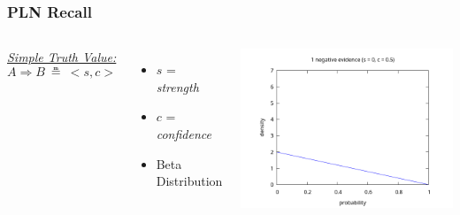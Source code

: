 \documentclass[aspectratio=169]{beamer}
\newcommand{\limp}{\Rightarrow}
\newcommand{\STV}[2]{<\!#1, #2\!>}
\begin{document}
\begin{frame}
  \frametitle{PLN Recall}
  \begin{columns}
    \column{5cm}
    \underline{\emph{Simple Truth Value:}}
    $$A \limp B\ \measeq\ \STV{s}{c}$$
    \begin{itemize}
    \item $s$ = \emph{strength}
    \item $c$ = \emph{confidence}
    \item Beta Distribution
    \end{itemize}
    \column{10cm}
    \includegraphics[scale=0.4]{figs/observations_1_0.png}
  \end{columns}
\end{frame}
\end{document}
